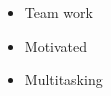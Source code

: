 %
%
%

\twocolumnsection
{
\begin{skills}
\end{skills}}
{
\vspace{1em}
\begin{itemize}
	\item Team work
	\item Motivated                    
    \item Multitasking
\end{itemize}
}